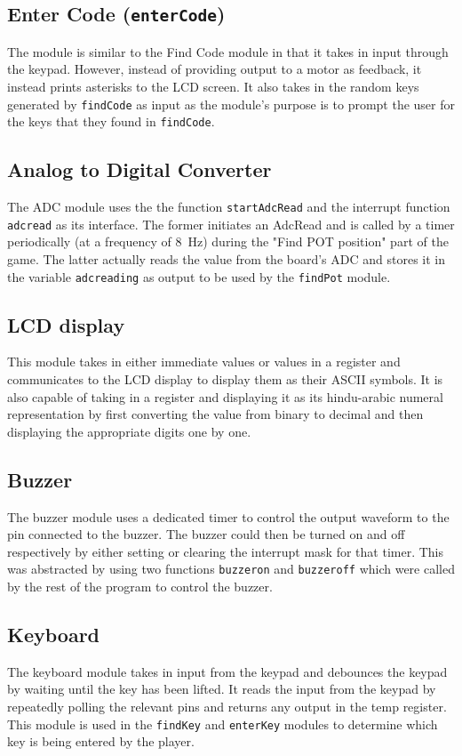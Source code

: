 \documentclass[a4paper]{article}
\begin{document}
\subsection{Enter Code (\texttt{enterCode})}
The module is similar to the Find Code module in that it takes in input through the keypad. However, instead of
providing output to a motor as feedback, it instead prints asterisks to the LCD screen. It also takes in the
random keys generated by \verb|findCode| as input as the module's purpose is to prompt the user for the keys
that they found in \verb|findCode|.

\subsection{Analog to Digital Converter}
The ADC module uses the the function \verb|startAdcRead| and the interrupt function \verb|adcread| as its 
interface. The former initiates an AdcRead and is called by a timer periodically (at a frequency of 
\SI{8}{\hertz}) during the "Find POT position" part of the game. The latter actually reads the value from the 
board's ADC and stores it in the variable \verb|adcreading| as output to be used by the \verb|findPot| module.

\subsection{LCD display}
This module takes in either immediate values or values in a register and communicates to the LCD display to
display them as their ASCII symbols. It is also capable of taking in a register and displaying it as its
hindu-arabic numeral representation by first converting the value from binary to decimal and then displaying
the appropriate digits one by one.

\subsection{Buzzer}
The buzzer module uses a dedicated timer to control the output waveform to the pin connected to
the buzzer. The buzzer could then be turned on and off respectively by either setting or clearing the interrupt
mask for that timer. This was abstracted by using two functions \verb|buzzeron| and \verb|buzzeroff| which were
called by the rest of the program to control the buzzer.

\subsection{Keyboard}
The keyboard module takes in input from the keypad and debounces the keypad by waiting until the key has been
lifted. It reads the input from the keypad by repeatedly polling the relevant pins and returns any output 
in the temp register. This module is used in the \verb|findKey| and \verb|enterKey| modules to determine which 
key is being entered by the player.
\end{document}
